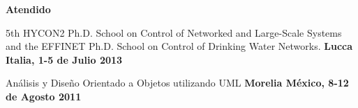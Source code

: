 \documentclass[10pt]{article}
\newenvironment{innerlist}[1][\enskip\textbullet]%
        {\begin{compactitem}[#1]}{\end{compactitem}}
\newcommand{\blankline}{\quad\pagebreak[2]}
\begin{document}





\textbf{Atendido}

\begin{innerlist}
\item 5th HYCON2 Ph.D. School on Control of Networked and Large-Scale Systems and the EFFINET Ph.D. School on Control of Drinking Water Networks. \textbf{Lucca Italia, 1-5 de Julio 2013}
\item Análisis y Diseño Orientado a Objetos utilizando  UML  \textbf{Morelia México,  8-12 de Agosto 2011}
\end{innerlist}
\end{document}
